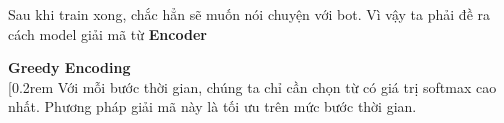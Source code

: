 Sau khi train xong, chắc hẳn sẽ muốn nói chuyện với bot. Vì vậy ta phải đề ra cách model giải mã từ \textbf{Encoder}

\Large\textbf{Greedy Encoding} \\ [0.2rem
Với mỗi bước thời gian, chúng ta chỉ cần chọn từ có giá trị softmax cao nhất. Phương pháp giải mã
này là tối ưu trên mức bước thời gian.